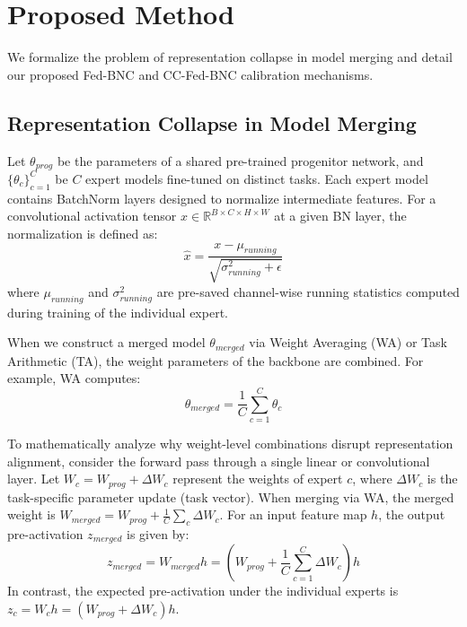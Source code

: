 \documentclass{article}
\theoremstyle{plain}
\theoremstyle{definition}
\theoremstyle{remark}
\begin{document}
\section{Proposed Method}
\label{sec:method}

We formalize the problem of representation collapse in model merging and detail our proposed Fed-BNC and CC-Fed-BNC calibration mechanisms.

\subsection{Representation Collapse in Model Merging}
Let $\theta_{prog}$ be the parameters of a shared pre-trained progenitor network, and $\{\theta_c\}_{c=1}^C$ be $C$ expert models fine-tuned on distinct tasks. Each expert model contains BatchNorm layers designed to normalize intermediate features. For a convolutional activation tensor $x \in \mathbb{R}^{B \times C \times H \times W}$ at a given BN layer, the normalization is defined as:
\begin{equation}
    \hat{x} = \frac{x - \mu_{running}}{\sqrt{\sigma_{running}^2 + \epsilon}}
\end{equation}
where $\mu_{running}$ and $\sigma_{running}^2$ are pre-saved channel-wise running statistics computed during training of the individual expert. 

When we construct a merged model $\theta_{merged}$ via Weight Averaging (WA) or Task Arithmetic (TA), the weight parameters of the backbone are combined. For example, WA computes:
\begin{equation}
    \theta_{merged} = \frac{1}{C} \sum_{c=1}^C \theta_c
\end{equation}

To mathematically analyze why weight-level combinations disrupt representation alignment, consider the forward pass through a single linear or convolutional layer. Let $W_c = W_{prog} + \Delta W_c$ represent the weights of expert $c$, where $\Delta W_c$ is the task-specific parameter update (task vector). When merging via WA, the merged weight is $W_{merged} = W_{prog} + \frac{1}{C} \sum_c \Delta W_c$. For an input feature map $h$, the output pre-activation $z_{merged}$ is given by:
\begin{equation}
    z_{merged} = W_{merged} h = \left( W_{prog} + \frac{1}{C} \sum_{c=1}^C \Delta W_c \right) h
\end{equation}
In contrast, the expected pre-activation under the individual experts is $z_c = W_c h = (W_{prog} + \Delta W_c) h$. 
\end{document}

